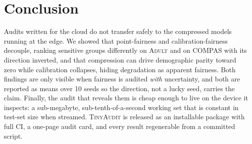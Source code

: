 \documentclass[11pt]{article}
\newcommand{\dataset}[1]{\textsc{#1}}
\begin{document}
\section{Conclusion}
\label{sec:conclusion}

Audits written for the cloud do not transfer safely to the compressed models
running at the edge. We showed that point-fairness and calibration-fairness
decouple, ranking sensitive groups differently on \dataset{Adult} and on
\dataset{COMPAS} with its direction inverted, and that compression can drive
demographic parity toward zero while calibration collapses, hiding degradation as
apparent fairness. Both findings are only visible when fairness is audited
\emph{with} uncertainty, and both are reported as means over 10 seeds so the
direction, not a lucky seed, carries the claim. Finally, the audit that reveals
them is cheap enough to live on the device it inspects: a sub-megabyte,
sub-tenth-of-a-second working set that is constant in test-set size when
streamed. \textsc{TinyAudit} is released as an installable package with full CI, a
one-page audit card, and every result regenerable from a committed script.



\end{document}
